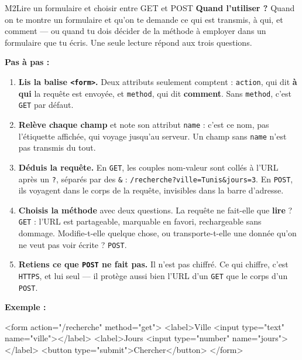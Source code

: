 \begin{fichemethode}{M2}{Lire un formulaire et choisir entre GET et POST}
\textbf{Quand l'utiliser ?} Quand on te montre un formulaire et qu'on te demande ce qui est
transmis, à qui, et comment — ou quand tu dois décider de la méthode à employer dans un
formulaire que tu écris. Une seule lecture répond aux trois questions.

\textbf{Pas à pas :}
\begin{enumerate}
  \item \textbf{Lis la balise \lstinline{<form>}.} Deux attributs seulement comptent :
    \lstinline{action}, qui dit \textbf{à qui} la requête est envoyée, et
    \lstinline{method}, qui dit \textbf{comment}. Sans \lstinline{method}, c'est
    \lstinline{GET} par défaut.
  \item \textbf{Relève chaque champ} et note son attribut \lstinline{name} : c'est ce nom,
    pas l'étiquette affichée, qui voyage jusqu'au serveur. Un champ sans \lstinline{name}
    n'est pas transmis du tout.
  \item \textbf{Déduis la requête.} En \lstinline{GET}, les couples nom-valeur sont collés à
    l'URL après un \lstinline{?}, séparés par des \lstinline{&} :
    \lstinline{/recherche?ville=Tunis&jours=3}. En \lstinline{POST}, ils voyagent dans le
    corps de la requête, invisibles dans la barre d'adresse.
  \item \textbf{Choisis la méthode} avec deux questions. La requête ne fait-elle que
    \textbf{lire} ? \lstinline{GET} : l'URL est partageable, marquable en favori,
    rechargeable sans dommage. Modifie-t-elle quelque chose, ou transporte-t-elle une donnée
    qu'on ne veut pas voir écrite ? \lstinline{POST}.
  \item \textbf{Retiens ce que \lstinline{POST} ne fait pas.} Il n'est pas chiffré. Ce qui
    chiffre, c'est \lstinline{HTTPS}, et lui seul — il protège aussi bien l'URL d'un
    \lstinline{GET} que le corps d'un \lstinline{POST}.
\end{enumerate}

\textbf{Exemple :}

\begin{console}
<form action="/recherche" method="get">
  <label>Ville  <input type="text" name="ville"></label>
  <label>Jours  <input type="number" name="jours"></label>
  <button type="submit">Chercher</button>
</form>
\end{console}


\end{fichemethode}
